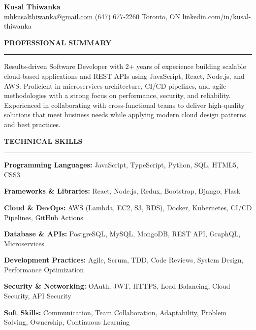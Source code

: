 \documentclass[10pt,letterpaper]{article}
\begin{document}
\begin{center}
{\LARGE\textbf{Kusal Thiwanka}}\\[3pt]
\href{mailto:mhkusalthiwanka@gmail.com}{mhkusalthiwanka@gmail.com}\hspace{2em}%
(647) 677{-}2260\hspace{2em}%
Toronto, ON\hspace{2em}
linkedin.com/in/kusal-thiwanka
\end{center}

\vspace{6pt}

\textbf{PROFESSIONAL SUMMARY}\\[-8pt]
\noindent\rule{\textwidth}{1pt}

\vspace{-2pt}

Results-driven Software Developer with 2+ years of experience building scalable cloud-based applications and REST APIs using JavaScript, React, Node.js, and AWS. Proficient in microservices architecture, CI/CD pipelines, and agile methodologies with a strong focus on performance, security, and reliability. Experienced in collaborating with cross-functional teams to deliver high-quality solutions that meet business needs while applying modern cloud design patterns and best practices.

\vspace{8pt}

\textbf{TECHNICAL SKILLS}\\[-8pt]
\noindent\rule{\textwidth}{1pt}

\vspace{-2pt}

\textbf{Programming Languages:} JavaScript, TypeScript, Python, SQL, HTML5, CSS3

\textbf{Frameworks \& Libraries:} React, Node.js, Redux, Bootstrap, Django, Flask

\textbf{Cloud \& DevOps:} AWS (Lambda, EC2, S3, RDS), Docker, Kubernetes, CI/CD Pipelines, GitHub Actions

\textbf{Database \& APIs:} PostgreSQL, MySQL, MongoDB, REST API, GraphQL, Microservices

\textbf{Development Practices:} Agile, Scrum, TDD, Code Reviews, System Design, Performance Optimization

\textbf{Security \& Networking:} OAuth, JWT, HTTPS, Load Balancing, Cloud Security, API Security

\textbf{Soft Skills:} Communication, Team Collaboration, Adaptability, Problem Solving, Ownership, Continuous Learning
\end{document}
